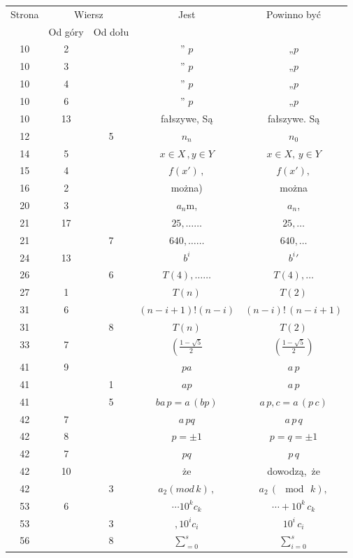 \documentclass[a4paper,11pt]{article}
\begin{document}
\begin{center}

  \begin{tabular}{|c|c|c|c|c|}
    \hline
    Strona & \multicolumn{2}{c|}{Wiersz} & Jest
                              & Powinno być \\ \cline{2-3}
    & Od góry & Od dołu & & \\
    \hline
    10  &  2 & & ” $p$ & „$p$ \\
    10  &  3 & & ” $p$ & „$p$ \\
    10  &  4 & & ” $p$ & „$p$ \\
    10  &  6 & & ” $p$ & „$p$ \\
    10  & 13 & & fałszywe, Są & fałszywe. Są \\
    12  & &  5 & $n_{ n }$ & $n_{ 0 }$ \\
    14  &  5 & & $x \in X \, , y \in Y$ & $x \in X, \, y \in Y$ \\
    15  &  4 & & $f( x' ) \, ,$ & $f( x' ),$ \\
    16  &  2 & & można) & można \\
    20  &  3 & & $a_{ n }$m, & $a_{ n }$, \\
    21  & 17 & & $25, \ldots \ldots$ & $25, \ldots$ \\
    21  & &  7 & $640, \ldots \ldots$ & $640, \ldots$ \\
    24  & 13 & & $b^{ i }$ & $b^{ i }{}'$ \\
    26  & &  6 & $T( 4 ), \ldots \ldots$ & $T( 4 ), \ldots$ \\
    27  &  1 & & $T( n )$ & $T( 2 )$ \\
    31  &  6 & & $( n - i + 1 )! ( n - i )$
    & $( n - i )! \, ( n - i + 1 )$ \\
    31  & &  8 & $T( n )$ & $T( 2 )$ \\
    33  &  7 & & $\left( \frac{ 1 - \sqrt{ 5 } }{ 2 } \right.$
    & $\left( \frac{ 1 - \sqrt{ 5 } }{ 2 } \right)$ \\
    41  &  9 & & $p a$ & $a \, p$ \\
    41  & &  1 & $a p$ & $a \, p$ \\
    41  & &  5 & $ba \, p = a \, ( b p )$ & $a \, p , c = a \, ( p \, c )$ \\
    42  &  7 & & $a \, p q$ & $a \, p \, q$ \\
    42  &  8 & & $p = \pm 1$ & $p = q = \pm 1$ \\
    42  &  7 & & $pq$ & $p \, q$ \\
    42  & 10 & & że & dowodzą,~że \\
    42  & &  3 & $a_{ 2 } ( mod \, k ) \, ,$ & $a_{ 2 } \, ( \mod \, k ),$ \\
    53  &  6 & & $\cdots 10^{ k } c_{ k }$ & $\cdots + 10^{ k } \, c_{ k }$ \\
    53  & &  3 & $, 10^{ i } c_{ i }$ & $10^{ i } \, c_{ i }$ \\
    56  & &  8 & $\displaystyle \sum_{ = 0 }^{ s }$
      & $\displaystyle \sum_{ i = 0 }^{ s }$ \\
    \hline
  \end{tabular}


\end{center}
\end{document}
